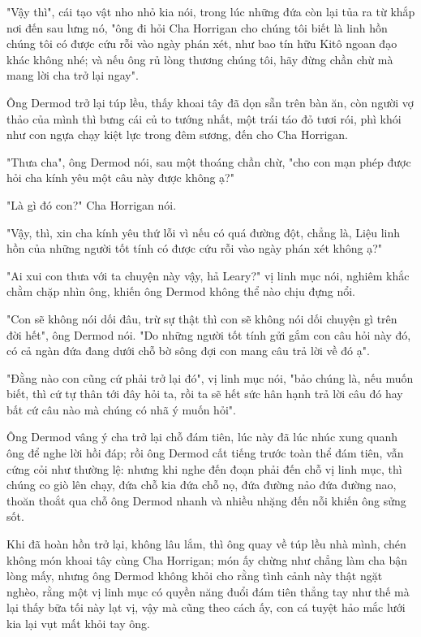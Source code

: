 "Vậy thì", cái tạo vật nho nhỏ kia nói, trong lúc những đứa còn lại tủa ra từ khắp nơi đến sau lưng nó, "ông đi hỏi Cha Horrigan cho chúng tôi biết là linh hồn chúng tôi có được cứu rỗi vào ngày phán xét, như bao tín hữu Kitô ngoan đạo khác không nhé; và nếu ông rủ lòng thương chúng tôi, hãy đừng chần chừ mà mang lời cha trở lại ngay".

Ông Dermod trở lại túp lều, thấy khoai tây đã dọn sẵn trên bàn ăn, còn người vợ thảo của mình thì bưng cái củ to tướng nhất, một trái táo đỏ tươi rói, phì khói như con ngựa chạy kiệt lực trong đêm sương, đến cho Cha Horrigan.

"Thưa cha", ông Dermod nói, sau một thoáng chần chừ, "cho con mạn phép được hỏi cha kính yêu một câu này được không ạ?"

"Là gì đó con?" Cha Horrigan nói.

"Vậy, thì, xin cha kính yêu thứ lỗi vì nếu có quá đường đột, chẳng là, Liệu linh hồn của những người tốt tính có được cứu rỗi vào ngày phán xét không ạ?"

"Ai xui con thưa với ta chuyện này vậy, hả Leary?" vị linh mục nói, nghiêm khắc chằm chặp nhìn ông, khiến ông Dermod không thể nào chịu đựng nổi.

"Con sẽ không nói dối đâu, trừ sự thật thì con sẽ không nói dối chuyện gì trên đời hết", ông Dermod nói. "Do những người tốt tính gửi gắm con câu hỏi này đó, có cả ngàn đứa đang dưới chỗ bờ sông đợi con mang câu trả lời về đó ạ".

"Đằng nào con cũng cứ phải trở lại đó", vị linh mục nói, "bảo chúng là, nếu muốn biết, thì cứ tự thân tới đây hỏi ta, rồi ta sẽ hết sức hân hạnh trả lời câu đó hay bất cứ câu nào mà chúng có nhã ý muốn hỏi".

Ông Dermod vâng ý cha trở lại chỗ đám tiên, lúc này đã lúc nhúc xung quanh ông để nghe lời hồi đáp; rồi ông Dermod cất tiếng trước toàn thể đám tiên, vẫn cứng cỏi như thường lệ: nhưng khi nghe đến đoạn phải đến chỗ vị linh mục, thì chúng co giò lên chạy, đứa chỗ kia đứa chỗ nọ, đứa đường nảo đứa đường nao, thoăn thoắt qua chỗ ông Dermod nhanh và nhiều nhặng đến nỗi khiến ông sửng sốt.

Khi đã hoàn hồn trở lại, không lâu lắm, thì ông quay về túp lều nhà mình, chén không món khoai tây cùng Cha Horrigan; món ấy chừng như chẳng làm cha bận lòng mấy, nhưng ông Dermod không khỏi cho rằng tình cảnh này thật ngặt nghèo, rằng một vị linh mục có quyền năng đuổi đám tiên thẳng tay như thế mà lại thấy bữa tối này lạt vị, vậy mà cũng theo cách ấy, con cá tuyệt hảo mắc lưới kia lại vụt mất khỏi tay ông.
